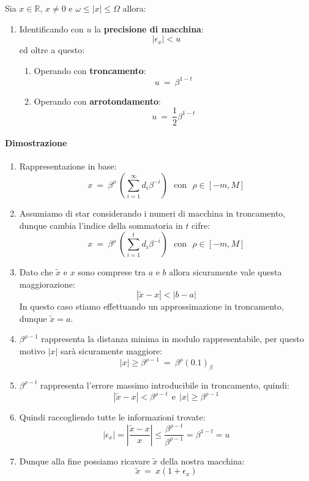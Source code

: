 \documentclass{article}
\begin{document}
Sia $x \in \mathbb{R}$, $x \neq 0$ e $\omega \leq |x| \leq \Omega$ allora:

\begin{enumerate}
    \item Identificando con $u$ la \textbf{precisione di macchina}:
    \[ |\epsilon_{x}| < u \]
    ed oltre a questo:
    \begin{enumerate}
        \item Operando con \textbf{troncamento}:
        \[ u \: = \: \beta^{1-t} \]
        \item Operando con \textbf{arrotondamento}:
        \[ u \: = \: \frac{1}{2}\beta^{1-t} \]
    \end{enumerate}
\end{enumerate}

\newpage

\paragraph{Dimostrazione}

\begin{enumerate}
    \item Rappresentazione in base: 
    \[ x \: = \: \beta^{\rho} \: (\sum^{\infty}_{i=1} d_{i}\beta^{-i}) \:\:\: \text{con} \:\:\: \rho \in [-m,M] \]
    \item Assumiamo di star considerando i numeri di macchina in troncamento, dunque cambia l'indice della sommatoria in $t$ cifre:
    \[ x \: = \: \beta^{\rho} \: (\sum^{t}_{i=1} d_{i}\beta^{-i}) \:\:\: \text{con} \:\:\: \rho \in [-m,M] \]
    \item Dato che $\tilde{x}$ e $x$ sono comprese tra $a$ e $b$ allora sicuramente vale questa maggiorazione:
    \[ |\tilde{x} - x| < |b-a| \]
    In questo caso stiamo effettuando un approssimazione in troncamento, dunque $\tilde{x} = a$.
    \item $\beta^{\rho-1}$ rappresenta la distanza minima in modulo rappresentabile, per questo motivo $|x|$ sarà sicuramente maggiore:
    \[ |x| \geq \beta^{\rho-1} \: = \: \beta^{\rho}(0.1)_{\beta} \]
    \item $\beta^{\rho - t}$ rappresenta l'errore massimo introducibile in troncamento, quindi:
    \[ |\tilde{x} - x| < \beta^{\rho - t} \:\: \text{e} \:\: |x| \geq \beta^{\rho - 1} \]
    \item Quindi raccogliendo tutte le informazioni trovate:
    \[ |\epsilon_{x}| = |\frac{\tilde{x} - x}{x}| \leq \frac{\beta^{\rho - t}}{\beta^{\rho - 1}} = \beta^{1-t} = u \]
    \item Dunque alla fine possiamo ricavare $\tilde{x}$ della nostra macchina:
    \[ \boxed{\tilde{x} \: = \: x(1+\epsilon_{x})} \]
\end{enumerate}
\end{document}
